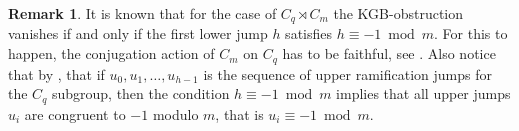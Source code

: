 \documentclass[11pt,letterpaper]{amsart}
\theoremstyle{definition}
\newtheorem{remark}[theorem]{Remark}
\renewcommand{\mod}{\bmod}
\begin{document}
\begin{remark}\label{remark:HKB}
  {It is known \cite[prop. 5.9]{Obus12} that}
for the case of $C_q \rtimes C_m$ the KGB-obstruction vanishes if and only if the first lower jump $h$ satisfies $h\equiv -1\mod m$. For this to happen, the conjugation action of $C_m$ on $C_q$ has to be faithful, see \cite[prop. 5.9]{Obus12}. Also notice that by \cite[th. 1.1]{MR2577662}, that if $u_0,u_1,\ldots,u_{h-1}$ is the sequence of upper ramification jumps for the $C_q$ subgroup, then the condition $h\equiv -1 \mod m$ implies that all upper jumps $u_i$ are congruent to $-1$ modulo $m$, that is $u_i \equiv -1 \mod m$. 
\end{remark}



%
%
%
\end{document}
